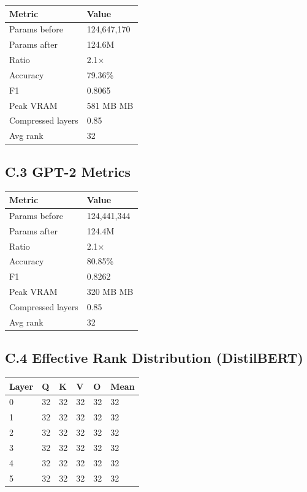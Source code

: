 \begin{table}[H]
\centering
\small
\begin{tabular}{ll}
\toprule
\textbf{Metric} & \textbf{Value} \\
\midrule
Params before & 124,647,170 \\
Params after & 124.6M \\
Ratio & 2.1$\times$ \\
Accuracy & 79.36\% \\
F1 & 0.8065 \\
Peak VRAM & 581 MB MB \\
Compressed layers & 0.85 \\
Avg rank & 32 \\
\bottomrule
\end{tabular}
\end{table}

\subsection{C.3 GPT-2 Metrics}

\begin{table}[H]
\centering
\small
\begin{tabular}{ll}
\toprule
\textbf{Metric} & \textbf{Value} \\
\midrule
Params before & 124,441,344 \\
Params after & 124.4M \\
Ratio & 2.1$\times$ \\
Accuracy & 80.85\% \\
F1 & 0.8262 \\
Peak VRAM & 320 MB MB \\
Compressed layers & 0.85 \\
Avg rank & 32 \\
\bottomrule
\end{tabular}
\end{table}

\subsection{C.4 Effective Rank Distribution (DistilBERT)}

\begin{table}[H]
\centering
\small
\begin{tabular}{llllll}
\toprule
\textbf{Layer} & \textbf{Q} & \textbf{K} & \textbf{V} & \textbf{O} & \textbf{Mean} \\
\midrule
0 & 32 & 32 & 32 & 32 & 32 \\
1 & 32 & 32 & 32 & 32 & 32 \\
2 & 32 & 32 & 32 & 32 & 32 \\
3 & 32 & 32 & 32 & 32 & 32 \\
4 & 32 & 32 & 32 & 32 & 32 \\
5 & 32 & 32 & 32 & 32 & 32 \\
\bottomrule
\end{tabular}
\end{table}

